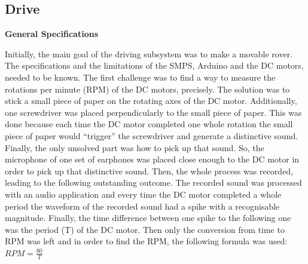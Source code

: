 \documentclass[a4paper]{article}
\begin{document}
\subsection{Drive}

\textbf{General Specifications}

Initially, the main goal of the driving subsystem was to make a movable rover. 
The specifications and the limitations of the SMPS, Arduino and the DC motors, 
needed to be known.  The first challenge was to find a way to measure the 
rotations per minute (RPM) of the DC motors, precisely. The solution was to 
stick a small piece of paper on the rotating axes of the DC motor. Additionally,
one screwdriver was placed perpendicularly to the small piece of paper. This was
done because each time the DC motor completed one whole rotation the small piece
of paper would ``trigger'' the screwdriver and generate a distinctive sound.
Finally, the only unsolved part was how to pick up that sound. So, the 
microphone of one set of earphones was placed close enough to the DC motor in order 
to pick up that distinctive sound. Then, the whole process was recorded, leading 
to the following outstanding outcome. The recorded sound was processed with an 
audio application and every time the DC motor completed a whole period the 
waveform of the recorded sound had a spike with a recognisable magnitude. 
Finally, the time difference between one spike to the following one was the 
period (T) of the DC motor. 
Then only the conversion from time to RPM was left and in order to find the RPM,
the following formula was used: \( RPM=\frac{60}{T} \) 

\end{document}

